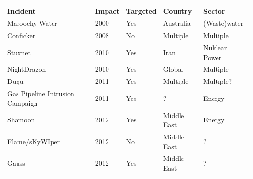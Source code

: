 \documentclass[runningheads]{llncs}
\begin{document}
\begin{table}[]
    \label{tab:incidents}
	\centering
    \begin{tabular}{|l|l|l|l|l|}
    \hline
    \textbf{Incident}               & \multicolumn{1}{l|}{\textbf{Impact}} & \multicolumn{1}{l|}{\textbf{Targeted}} & \multicolumn{1}{l|}{\textbf{Country}} & \textbf{Sector} \\ \hline
    Maroochy Water                  & 2000                                       & Yes                                    & Australia                                    & (Waste)water                         \\
    Conficker                       & 2008                                       & No                                     & Multiple                              & Multiple                             \\
    Stuxnet                         & 2010                                       & Yes                                    & Iran                                         & Nuklear Power                        \\
    NightDragon                     & 2010                                       & Yes                                    & Global                                       & Multiple                             \\
    Duqu                            & 2011                                       & Yes                                    & Multiple                                     & Multiple?                            \\
    Gas Pipeline Intrusion Campaign & 2011                                       & Yes                                    & ?                                            & Energy                               \\
    Shamoon                         & 2012                                       & Yes                                    & Middle East                                  & Energy                               \\
    Flame/sKyWIper                  & 2012                                       & No                                     & Middle East                                  & ?                                    \\
    Gauss                           & 2012                                       & Yes                                    & Middle East                                  & ?                                    \\

\end{tabular}
\end{table}
\end{document}
